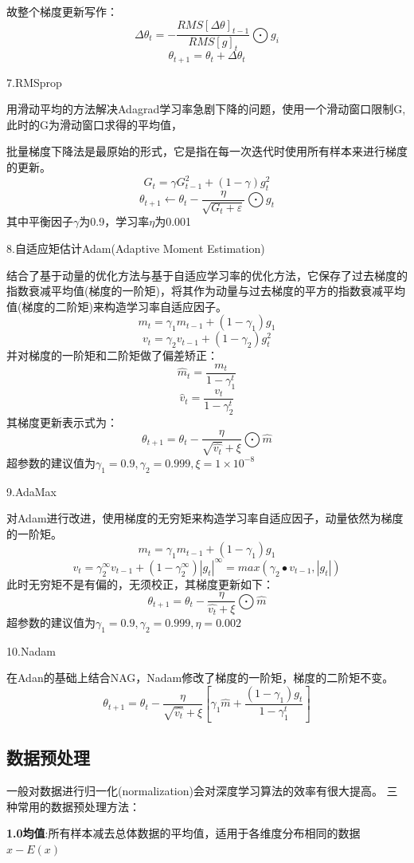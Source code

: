 \documentclass[openbib]{article}
\begin{document}
故整个梯度更新写作：
$$\Delta \theta_t=-\frac{RMS[\Delta \theta]_{t-1}}{RMS[g]_t}\bigodot g_i$$
$$\theta_{t+1}=\theta_t + \Delta \theta_t$$
\begin{center}
	7.RMSprop
\end{center}
用滑动平均的方法解决Adagrad学习率急剧下降的问题，使用一个滑动窗口限制G,此时的G为滑动窗口求得的平均值，

批量梯度下降法是最原始的形式，它是指在每一次迭代时使用所有样本来进行梯度的更新。
$$G_t=\gamma G_{t-1}^2+(1-\gamma)g_t^2$$
$$\theta_{t+1}\leftarrow \theta_t- \frac{\eta}{\sqrt{{G_t+\varepsilon}}}\bigodot g_t$$
其中平衡因子$\gamma$为0.9，学习率$\eta$为0.001
\begin{center}
	8.自适应矩估计Adam(Adaptive Moment Estimation)
\end{center}
结合了基于动量的优化方法与基于自适应学习率的优化方法，它保存了过去梯度的指数衰减平均值(梯度的一阶矩)，将其作为动量与过去梯度的平方的指数衰减平均值(梯度的二阶矩)来构造学习率自适应因子。
$$m_t=\gamma_1m_{t-1} + (1-\gamma_1)g_1$$
$$v_t=\gamma_2v_{t-1} + (1-\gamma_2)g_t^2$$
并对梯度的一阶矩和二阶矩做了偏差矫正：
$$\hat{m}_t = \frac{m_t}{1-\gamma_1^t}$$
$$\hat{v}_t = \frac{v_t}{1-\gamma_2^t}$$
其梯度更新表示式为：
$$\theta_{t+1}=\theta_t - \frac{\eta}{\sqrt{\hat{v_t}}+\xi}\bigodot \hat{m}$$
超参数的建议值为$\gamma_1=0.9,\gamma_2=0.999,\xi=1\times 10^{-8}$
\begin{center}
	9.AdaMax
\end{center}
对Adam进行改进，使用梯度的无穷矩来构造学习率自适应因子，动量依然为梯度的一阶矩。
$$m_t=\gamma_1m_{t-1} + (1-\gamma_1)g_1$$
$$v_t=\gamma_2^{\infty}v_{t-1} + (1-\gamma_2^{\infty})|g_t|^{\infty}=max(\gamma_2\bullet v_{t-1},|g_t|)$$
此时无穷矩不是有偏的，无须校正，其梯度更新如下：
$$\theta_{t+1}=\theta_t - \frac{\eta}{\hat{v_t}+\xi}\bigodot \hat{m}$$
超参数的建议值为$\gamma_1=0.9,\gamma_2=0.999,\eta = 0.002$
\begin{center}
	10.Nadam
\end{center}
在Adan的基础上结合NAG，Nadam修改了梯度的一阶矩，梯度的二阶矩不变。
$$\theta_{t+1}=\theta_t - \frac{\eta}{\sqrt{\hat{v_t}}+\xi}[\gamma_1\hat{m}+\frac{(1-\gamma_1)g_t}{1-\gamma_1^t}]$$
\subsection{数据预处理}
一般对数据进行归一化(normalization)会对深度学习算法的效率有很大提高。
三种常用的数据预处理方法：

\textbf{1.0均值}:所有样本减去总体数据的平均值，适用于各维度分布相同的数据$x-E(x)$
\end{document}
